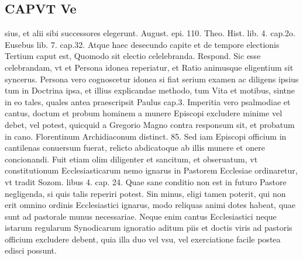 \documentclass{article}
\begin{document}
\begin{pages}
\section*{CAPVT  Ve }
\marginpar{[ p.357 ]}\pstart sius, et alii sibi successores elegerunt. August. epi. 110. Theo. Hist. lib. 4. cap.2o. Eusebus lib. 7. cap.32. Atque haec desecundo capite et de tempore electionis Tertium caput est, Quomodo sit electio celelebranda. Respond. Sic esse celebrandam, vt et Persona idonea reperiatur, et Ratio animusque eligentium sit syncerus. Persona vero cognoscetur idonea si fiat serium examen ac diligens ipsius tum in Doctrina ipsa, et illius explicandae methodo, tum Vita et motibus, sintne in eo tales, quales antea praescripsit Paulus cap.3. Imperitia vero psalmodiae et cantus, doctum et probum hominem a munere Episcopi excludere minime vel debet, vel potest, quicquid a Gregorio Magno contra responsum sit, et probatum in cano. Florentinum Archidiaconum distinct. 85. Sed iam Episcopi officium in cantilenas conuersum fuerat, relicto abdicatoque ab illis munere et onere concionandi. Fuit etiam olim diligenter et sancitum, et obseruatum, vt constitutionum Ecclesiasticarum nemo ignarus in Pastorem Ecclesiae ordinaretur, vt tradit Sozom. libus 4. cap. 24. Quae sane conditio non est in futuro Pastore negligenda, si quis talis reperiri potest. Sin minus, eligi tamen poterit, qui non erit omnino ordinis Ecclesiastici ignarus, modo reliquas animi dotes habeat, quae sunt ad pastorale munus necessariae. Neque enim cantus Ecclesiastici neque istarum regularum Synodicarum ignoratio aditum piis et doctis viris ad pastoris officium excludere debent, quia illa duo vel vsu, vel exerciatione facile postea edisci possunt.  \pend

\end{pages}
\end{document}
